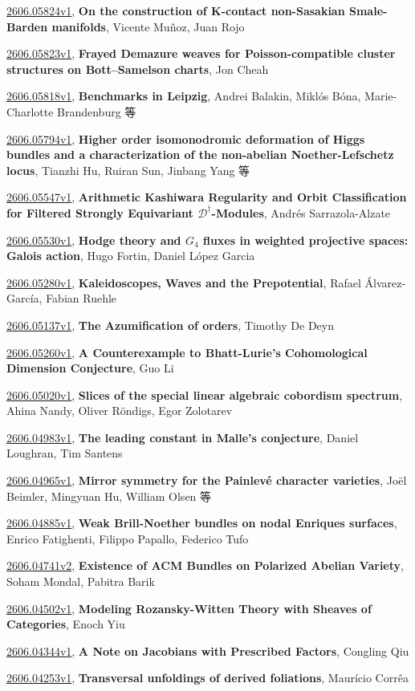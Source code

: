\documentclass[9pt, a4paper]{article}
\theoremstyle{plain}
\theoremstyle{definition}
\theoremstyle{remark}
\newcommand{\arxiv}[3]{\href{https://arxiv.org/abs/#1}{#1}, \textbf{\textcolor{arxivblue}{#2}}, #3}
\begin{document}
\arxiv{2606.05824v1}{On the construction of K-contact non-Sasakian Smale-Barden manifolds}{Vicente Muñoz, Juan Rojo}

\arxiv{2606.05823v1}{Frayed Demazure weaves for Poisson-compatible cluster structures on Bott--Samelson charts}{Jon Cheah}

\arxiv{2606.05818v1}{Benchmarks in Leipzig}{Andrei Balakin, Miklós Bóna, Marie-Charlotte Brandenburg 等}

\arxiv{2606.05794v1}{Higher order isomonodromic deformation of Higgs bundles and a characterization of the non-abelian Noether-Lefschetz locus}{Tianzhi Hu, Ruiran Sun, Jinbang Yang 等}

\arxiv{2606.05547v1}{Arithmetic Kashiwara Regularity and Orbit Classification for Filtered Strongly Equivariant $\mathcal{D}^{\dagger}$-Modules}{Andrés Sarrazola-Alzate}

\arxiv{2606.05530v1}{Hodge theory and $G_4$ fluxes in weighted projective spaces: Galois action}{Hugo Fortin, Daniel López Garcia}

\arxiv{2606.05280v1}{Kaleidoscopes, Waves and the Prepotential}{Rafael Álvarez-García, Fabian Ruehle}

\arxiv{2606.05137v1}{The Azumification of orders}{Timothy De Deyn}

\arxiv{2606.05260v1}{A Counterexample to Bhatt-Lurie's Cohomological Dimension Conjecture}{Guo Li}

\arxiv{2606.05020v1}{Slices of the special linear algebraic cobordism spectrum}{Ahina Nandy, Oliver Röndigs, Egor Zolotarev}

\arxiv{2606.04983v1}{The leading constant in Malle's conjecture}{Daniel Loughran, Tim Santens}

\arxiv{2606.04965v1}{Mirror symmetry for the Painlevé character varieties}{Joël Beimler, Mingyuan Hu, William Olsen 等}

\arxiv{2606.04885v1}{Weak Brill-Noether bundles on nodal Enriques surfaces}{Enrico Fatighenti, Filippo Papallo, Federico Tufo}

\arxiv{2606.04741v2}{Existence of ACM Bundles on Polarized Abelian Variety}{Soham Mondal, Pabitra Barik}

\arxiv{2606.04502v1}{Modeling Rozansky-Witten Theory with Sheaves of Categories}{Enoch Yiu}

\arxiv{2606.04344v1}{A Note on Jacobians with Prescribed Factors}{Congling Qiu}

\arxiv{2606.04253v1}{Transversal unfoldings of derived foliations}{Maurício Corrêa}
\end{document}

